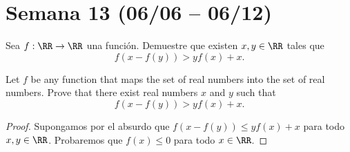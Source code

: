 \section{Semana 13 (06/06 -- 06/12)}


\begin{probMR}
	Sea $f:\RR\to\RR$ una función. Demuestre que existen $x,y\in\RR$ tales que
	\[f(x-f(y))>yf(x)+x.\]
	\begin{hint}
		Let $f$ be any function that maps the set of real numbers into the set of real numbers. Prove that there exist real numbers $x$ and $y$ such that
		\[f(x-f(y))>yf(x)+x.\]
	\end{hint}
\end{probMR}

\begin{proof}
	Supongamos por el absurdo que $f(x-f(y))\le yf(x)+x$ para todo $x,y\in\RR$. Probaremos que $f(x)\le 0$ para todo $x\in\RR$.
\end{proof}

